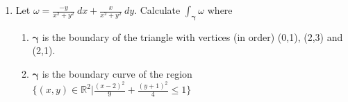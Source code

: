 \documentclass{article}
\newcommand{\gam}{\boldsymbol{\gamma}}
\begin{document}
\thispagestyle{fancy}

\begin{enumerate}
    \item Let $\displaystyle \omega = \frac{-y}{x^2+y^2}\ dx + \frac{x}{x^2+y^2}\ dy$. Calculate $\displaystyle \int_{\gam} \omega$ where
    \begin{enumerate}
        \item $\gam$ is the boundary of the triangle with vertices (in order) (0,1), (2,3) and (2,1).
        \item $\gam$ is the boundary curve of the region $\displaystyle \Bigg\{(x,y) \in \mathbb{R}^2 \Bigg|\frac{(x-2)^2}{9} + \frac{(y+1)^2}{4} \leq 1 \Bigg\}$
    \end{enumerate}
\end{enumerate}
\end{document}
